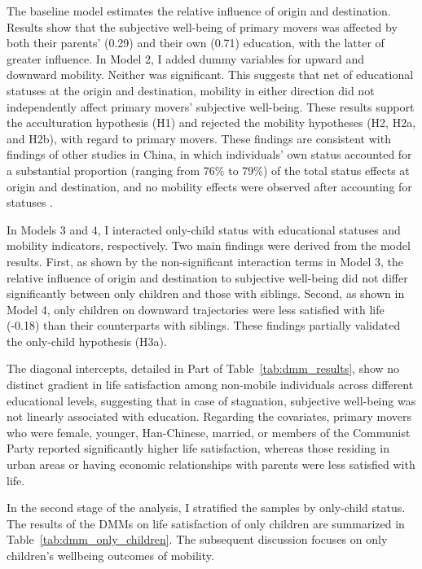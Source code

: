The baseline model estimates the relative influence of origin and destination. Results show that the subjective well-being of primary movers was affected by both their parents' (0.29) and their own (0.71) education, with the latter of greater influence. In Model 2, I added dummy variables for upward and downward mobility. Neither was significant. This suggests that net of educational statuses at the origin and destination, mobility in either direction did not independently affect primary movers' subjective well-being. These results support the acculturation hypothesis (H1) and rejected the mobility hypotheses (H2, H2a, and H2b), with regard to primary movers. These findings are consistent with findings of other studies in China, in which individuals' own status accounted for a substantial proportion (ranging from 76\% to 79\%) of the total status effects at origin and destination, and no mobility effects were observed after accounting for statuses \parencite{zangFrustratedAchieversSatisfied2016,zhaoDifferentialAcculturationStudy2019,zhaoInterIntragenerationalSocial2017}.

In Models 3 and 4, I interacted only-child status with educational statuses and mobility indicators, respectively. Two main findings were derived from the model results. First, as shown by the non-significant interaction terms in Model 3, the relative influence of origin and destination to subjective well-being did not differ significantly between only children and those with siblings. Second, as shown in Model 4, only children on downward trajectories were less satisfied with life (-0.18) than their counterparts with siblings. These findings partially validated the only-child hypothesis (H3a).

The diagonal intercepts, detailed in Part  of Table~\ref{tab:dmm_results}, show no distinct gradient in life satisfaction among non-mobile individuals across different educational levels, suggesting that in case of stagnation, subjective well-being was not linearly associated with education. Regarding the covariates, primary movers who were female, younger, Han-Chinese, married, or members of the Communist Party reported significantly higher life satisfaction, whereas those residing in urban areas or having economic relationships with parents were less satisfied with life.

In the second stage of the analysis, I stratified the samples by only-child status. The results of the DMMs on life satisfaction of only children are summarized in Table~\ref{tab:dmm_only_children}. The subsequent discussion focuses on only children's wellbeing outcomes of mobility.

